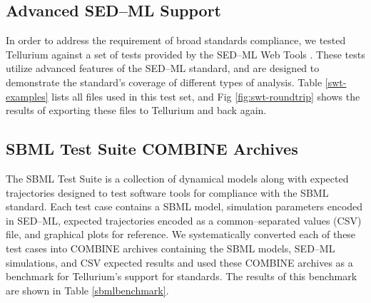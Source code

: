 \documentclass[10pt,letterpaper]{article}
\begin{document}
\subsection*{Advanced SED--ML Support}

In order to address the requirement of broad standards compliance, we tested Tellurium against a set of tests provided by the SED--ML Web Tools \cite{bergmann2017sed}. These tests utilize advanced features of the SED--ML standard, and are designed to demonstrate the standard's coverage of different types of analysis. Table \ref{swt-examples} lists all files used in this test set, and Fig \ref{fig:swt-roundtrip} shows the results of exporting these files to Tellurium and back again.

\subsection*{SBML Test Suite COMBINE Archives}

The SBML Test Suite \cite{sbmltestsuite} is a collection of dynamical models along with expected trajectories designed to test software tools for compliance with the SBML standard. Each test case contains a SBML model, simulation parameters encoded in SED--ML, expected trajectories encoded as a common--separated values (CSV) file, and graphical plots for reference. We systematically converted each of these test cases into COMBINE archives containing the SBML models, SED--ML simulations, and CSV expected results and used these COMBINE archives as a benchmark for Tellurium's support for standards. The results of this benchmark are shown in Table \ref{sbmlbenchmark}.







\end{document}
